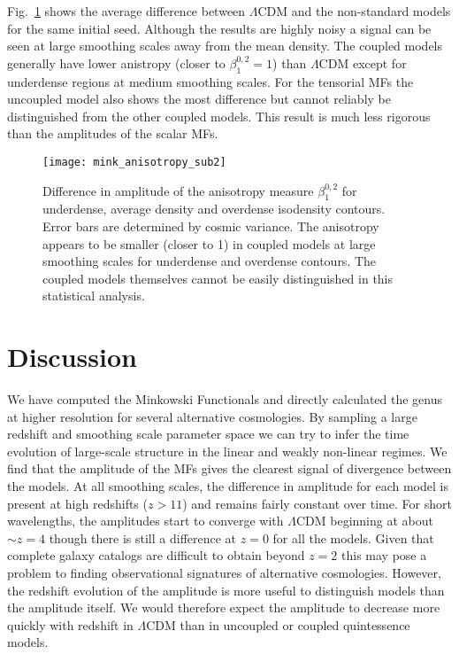 \documentclass[a4paper,fleqn,usenatbib]{mnras}
\begin{document}
Fig.~\ref{fig:anis} shows the average difference between $\Lambda$CDM and the non-standard models for the same initial seed. Although the results are highly noisy a signal can be seen at large smoothing scales away from the mean density. The coupled models generally have lower anistropy (closer to $\beta_1^{0,2}=1$) than $\Lambda$CDM except for underdense regions at medium smoothing scales. For the tensorial MFs the uncoupled model also shows the most difference but cannot reliably be distinguished from the other coupled models. This result is much less rigorous than the amplitudes of the scalar MFs.

 \begin{figure}
	\texttt{[image: mink\_anisotropy\_sub2]}
    \caption{Difference in amplitude of the anisotropy measure $\beta_1^{0,2}$ for underdense, average density and overdense isodensity contours. Error bars are determined by cosmic variance. The anisotropy appears to be smaller (closer to 1) in coupled models at large smoothing scales for underdense and overdense contours. The coupled models themselves cannot be easily distinguished in this statistical analysis.}
    \label{fig:anis}
 \end{figure}


\section{Discussion}
\label{sec:discussion}
We have computed the Minkowski Functionals and directly calculated the genus at higher resolution for several alternative cosmologies. By sampling a large redshift and smoothing scale parameter space we can try to infer the time evolution of large-scale structure in the linear and weakly non-linear regimes. We find that the amplitude of the MFs gives the clearest signal of divergence between the models. At all smoothing scales, the difference in amplitude for each model is present at high redshifts ($z > 11$) and remains fairly constant over time. For short wavelengths, the amplitudes start to converge with $\Lambda$CDM beginning at about $\sim z=4$ though there is still a difference at $z=0$ for all the models. Given that complete galaxy catalogs are difficult to obtain beyond $z=2$ this may pose a problem to finding observational signatures of alternative cosmologies. However, the redshift evolution of the amplitude is more useful to distinguish models than the amplitude itself. We would therefore expect the amplitude to decrease more quickly with redshift in $\Lambda$CDM than in uncoupled or coupled quintessence models.
\end{document}
